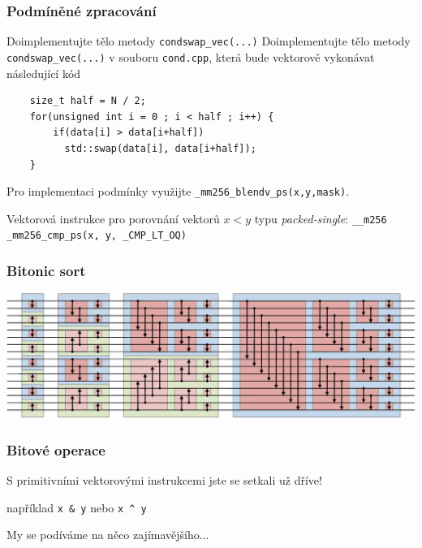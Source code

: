 \documentclass[usenames,dvipsnames,9pt]{beamer}
\begin{document}
\begin{frame}[fragile]
  \frametitle{Podmíněné zpracování}

  \begin{block}{Doimplementujte tělo metody \texttt{condswap\_vec(...)}}
    Doimplementujte tělo metody \texttt{condswap\_vec(...)} v souboru \texttt{cond.cpp}, která bude vektorově vykonávat následující kód
    \begin{verbatim}
    size_t half = N / 2;
    for(unsigned int i = 0 ; i < half ; i++) {
        if(data[i] > data[i+half])
          std::swap(data[i], data[i+half]);
    }
    \end{verbatim}
    Pro implementaci podmínky využijte \texttt{_mm256_blendv_ps(x,y,mask)}.
  \end{block}

  \vspace{1.5em}

  Vektorová instrukce pro porovnání vektorů $x < y$ typu \emph{packed-single}:
  \texttt{__m256 _mm256_cmp_ps(x, y, _CMP_LT_OQ)}
\end{frame}

\begin{frame}
  \frametitle{Bitonic sort}
  \includegraphics[width=\linewidth]{07/figs/bitonic.pdf}
\end{frame}

\begin{frame}
  \frametitle{Bitové operace}

  \begin{center}
    \Large S primitivními vektorovými instrukcemi jste se setkali už dříve!

    \normalsize například \texttt{x & y} nebo \texttt{x ^ y}
  \end{center}

  \vspace{3em}

  \pause
  \hfill My se podíváme na něco zajímavějšího...
\end{frame}
\end{document}
